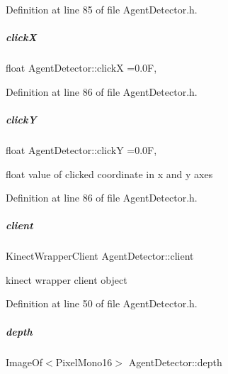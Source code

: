 Definition at line 85 of file Agent\+Detector.\+h.

\mbox{\label{group__agentDetector_a03df7736aa16aabd5c50b122b1bbac4a}} 
\subparagraph{\texorpdfstring{clickX}{clickX}}
{\footnotesize\ttfamily float Agent\+Detector\+::clickX =0.\+0F\hspace{0.3cm}{\ttfamily [static]}, {\ttfamily [protected]}}



Definition at line 86 of file Agent\+Detector.\+h.

\mbox{\label{group__agentDetector_ab855a695c17b0ce07aab0356c5a53d1f}} 
\subparagraph{\texorpdfstring{clickY}{clickY}}
{\footnotesize\ttfamily float Agent\+Detector\+::clickY =0.\+0F\hspace{0.3cm}{\ttfamily [static]}, {\ttfamily [protected]}}



float value of clicked coordinate in x and y axes 



Definition at line 86 of file Agent\+Detector.\+h.

\mbox{\label{group__agentDetector_a2f5671fc2803530ccad5d6e46315f054}} 
\subparagraph{\texorpdfstring{client}{client}}
{\footnotesize\ttfamily Kinect\+Wrapper\+Client Agent\+Detector\+::client\hspace{0.3cm}{\ttfamily [protected]}}



kinect wrapper client object 



Definition at line 50 of file Agent\+Detector.\+h.

\mbox{\label{group__agentDetector_a3787f2b0cf6d213321d9590ac18b8958}} 
\subparagraph{\texorpdfstring{depth}{depth}}
{\footnotesize\ttfamily Image\+Of$<$Pixel\+Mono16$>$ Agent\+Detector\+::depth\hspace{0.3cm}{\ttfamily [protected]}}



